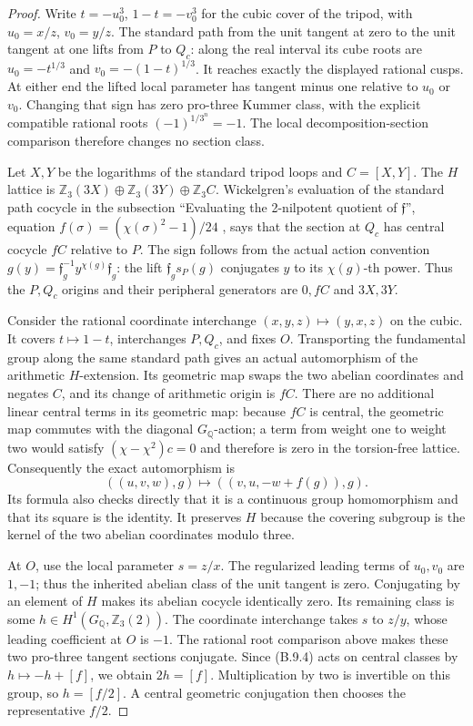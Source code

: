 \begin{proof}
Write $t=-u_0^3$, $1-t=-v_0^3$ for the cubic cover of the
tripod, with $u_0=x/z$, $v_0=y/z$.
The standard path from the unit tangent at zero to the
unit tangent at one lifts from $P$ to $Q_c$: along the
real interval its cube roots are
$u_0=-t^{1/3}$ and $v_0=-(1-t)^{1/3}$.
It reaches exactly the displayed rational cusps.
At either end the lifted local parameter has tangent
minus one relative to $u_0$ or $v_0$.
Changing that sign has zero pro-three Kummer class,
with the explicit compatible rational roots
$(-1)^{1/3^n}=-1$.  The local decomposition-section
comparison therefore changes no section class.

Let $X,Y$ be the logarithms of the standard tripod loops
and $C=[X,Y]$.  The $H$ lattice is
$\mathbb Z_3(3X)\oplus\mathbb Z_3(3Y)\oplus\mathbb Z_3 C$.
Wickelgren's evaluation of the standard path cocycle in
the subsection ``Evaluating the 2-nilpotent quotient of
$\mathfrak f$'', equation
$f(\sigma)=(\chi(\sigma)^2-1)/24$
\cite{BC_Wickelgren2012}, says that the section at $Q_c$
has central cocycle $fC$ relative to $P$.
The sign follows from the actual action convention
$g(y)=\mathfrak f_g^{-1}y^{\chi(g)}\mathfrak f_g$:
the lift $\mathfrak f_gs_P(g)$ conjugates $y$ to its
$\chi(g)$-th power.  Thus the $P,Q_c$ origins and their
peripheral generators are $0,fC$ and $3X,3Y$.

Consider the rational coordinate interchange
$(x,y,z)\mapsto(y,x,z)$ on the cubic.  It covers
$t\mapsto1-t$, interchanges $P,Q_c$, and fixes $O$.
Transporting the fundamental group along the same
standard path gives an actual automorphism of the
arithmetic $H$-extension.  Its geometric map swaps the
two abelian coordinates and negates $C$, and its change
of arithmetic origin is $fC$.  There are no additional
linear central terms in its geometric map: because
$fC$ is central, the geometric map commutes with the
diagonal $G_{\mathbb Q}$-action; a term from weight one
to weight two would satisfy $(\chi-\chi^2)c=0$ and
therefore is zero in the torsion-free lattice.
Consequently the exact automorphism is
\[
 ((u,v,w),g)\longmapsto((v,u,-w+f(g)),g).                   \tag{B.9.4}
\]
Its formula also checks directly that it is a continuous
group homomorphism and that its square is the identity.
It preserves $H$ because the covering subgroup is the
kernel of the two abelian coordinates modulo three.

At $O$, use the local parameter $s=z/x$.
The regularized leading terms of $u_0,v_0$ are $1,-1$;
thus the inherited abelian class of the unit tangent is
zero.  Conjugating by an element of $H$ makes its
abelian cocycle identically zero.  Its remaining class
is some $h\in H^1(G_{\mathbb Q},\mathbb Z_3(2))$.
The coordinate interchange takes $s$ to $z/y$, whose
leading coefficient at $O$ is $-1$.  The rational root
comparison above makes these two pro-three tangent
sections conjugate.  Since (B.9.4) acts on central
classes by $h\mapsto-h+[f]$, we obtain
$2h=[f]$.  Multiplication by two is invertible on this
group, so $h=[f/2]$.  A central geometric conjugation
then chooses the representative $f/2$.


\end{proof}
